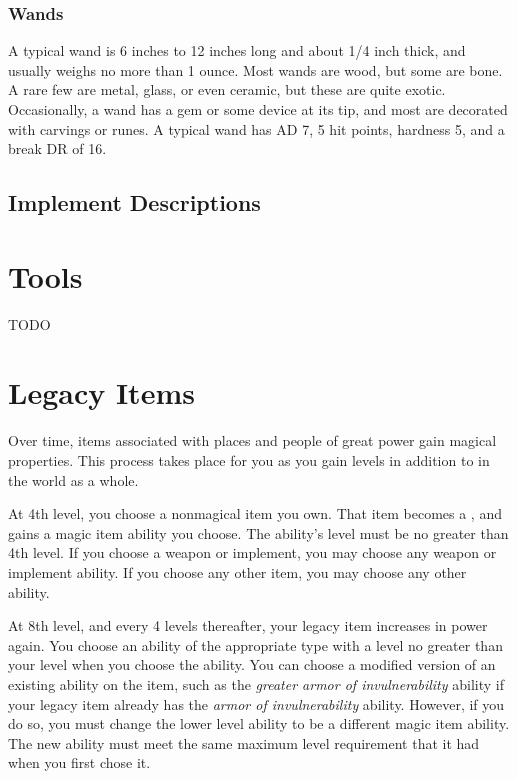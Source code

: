        \subsubsection{Wands}

             A typical wand is 6 inches to 12 inches long and about 1/4 inch thick, and usually weighs no more than 1 ounce.
            Most wands are wood, but some are bone.
            A rare few are metal, glass, or even ceramic, but these are quite exotic.
            Occasionally, a wand has a gem or some device at its tip, and most are decorated with carvings or runes.
            A typical wand has AD 7, 5 hit points, hardness 5, and a break DR of 16.

    \subsection{Implement Descriptions}

        

\section{Tools}

    TODO

\section{Legacy Items}\label{Legacy Items}

    Over time, items associated with places and people of great power gain magical properties.
    This process takes place for you as you gain levels in addition to in the world as a whole.

    At 4th level, you choose a nonmagical item you own.
    That item becomes a , and gains a magic item ability you choose.
    The ability's level must be no greater than 4th level.
    If you choose a weapon or implement, you may choose any weapon or implement ability.
    If you choose any other item, you may choose any other ability.

    At 8th level, and every 4 levels thereafter, your legacy item increases in power again.
    You choose an ability of the appropriate type with a level no greater than your level when you choose the ability.
    You can choose a modified version of an existing ability on the item, such as the \textit{greater armor of invulnerability} ability if your legacy item already has the \textit{armor of invulnerability} ability.
    However, if you do so, you must change the lower level ability to be a different magic item ability.
    The new ability must meet the same maximum level requirement that it had when you first chose it.

